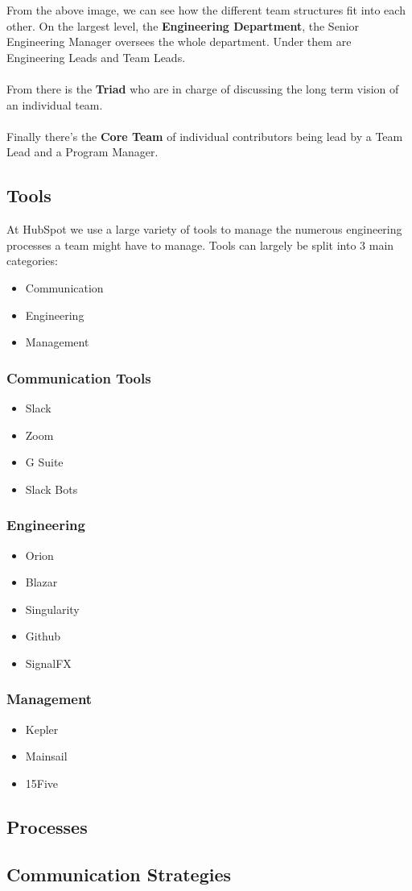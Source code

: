 \documentclass[11pt]{article} %
\begin{document}
From the above image, we can see how the different team structures fit into each other. On the largest level, the \textbf{Engineering Department}, the Senior Engineering Manager oversees the whole department. Under them are Engineering Leads and Team Leads. 
\\\\
From there is the \textbf{Triad} who are in charge of discussing the long term vision of an individual team. 
\\\\
Finally there's the \textbf{Core Team} of individual contributors being lead by a Team Lead and a Program Manager.

\subsection{Tools}
At HubSpot we use a large variety of tools to manage the numerous engineering processes a team might have to manage. Tools can largely be split into 3 main categories: \begin{itemize} \item Communication \item Engineering \item Management \end{itemize}
\subsubsection{\textbf{Communication Tools}}
\begin{itemize}
\item Slack
\item Zoom
\item G Suite 
\item Slack Bots
\end{itemize}
\subsubsection{\textbf{Engineering}}
\begin{itemize}
\item Orion
\item Blazar
\item Singularity
\item Github
\item SignalFX
\end{itemize}
\subsubsection{\textbf{Management}}
\begin{itemize}
\item Kepler
\item Mainsail 
\item 15Five
\end{itemize}
\subsection{Processes}
\subsection{Communication Strategies}
\end{document}
